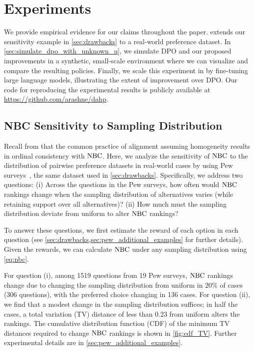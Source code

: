 \section{Experiments}

We provide empirical evidence for our claims throughout the paper.  extends our sensitivity example in \cref{sec:drawbacks} to
a real-world preference dataset. In \cref{sec:simulate_dpo_with_unknown_u}, we simulate DPO and our proposed improvements in a synthetic, small-scale environment where we can visualize and compare the resulting policies. Finally, we scale this experiment in  by fine-tuning large language models, illustrating the extent of improvement over DPO. 
\ifarxiv 
Our code for reproducing the experimental results is publicly available at \url{https://github.com/arashne/dahp}.
\fi

\subsection{NBC Sensitivity to Sampling Distribution}
\label{sec:sensitivity}
Recall from  that the common practice of alignment assuming homogeneity results in ordinal consistency with ${\rm NBC}$.  
Here, we analyze the sensitivity of ${\rm NBC}$ to the distribution of pairwise preference datasets in real-world cases by using Pew surveys~\citep{pew_about}, the same dataset used in \cref{sec:drawbacks}. Specifically, we address two questions: (i) Across the questions in the Pew surveys, how often would ${\rm NBC}$ rankings change when the sampling distribution of alternatives varies (while retaining support over all alternatives)? (ii) How much must the sampling distribution deviate from uniform to alter ${\rm NBC}$ rankings?

To answer these questions, we first estimate the reward of each option in each question (see \cref{sec:drawbacks,sec:pew_additional_examples} for further details). Given the rewards, we can calculate ${\rm NBC}$ under any sampling distribution using \cref{eq:nbc}.

For question (i), among 1519 questions from 19 Pew surveys, ${\rm NBC}$ rankings change due to changing the sampling distribution from uniform in 20\% of cases (306 questions), with the preferred choice changing in 136 cases. For question (ii), we find that a modest change in the sampling distribution suffices; in half the cases, a total variation (TV) distance of less than 0.23 from uniform alters the rankings. The cumulative distribution function (CDF) of the minimum TV distances required to change ${\rm NBC}$ rankings is shown in \cref{fig:cdf_TV}. Further experimental details are in \cref{sec:pew_additional_examples}.

